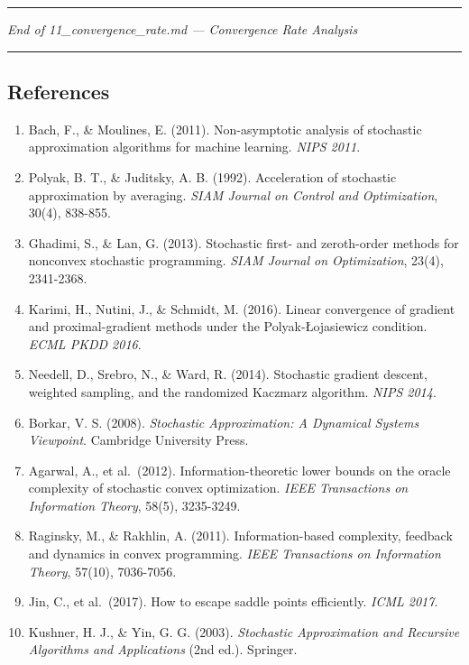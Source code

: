 \documentclass[
  12pt,
]{article}
\providecommand{\tightlist}{%
  \setlength{\itemsep}{0pt}\setlength{\parskip}{0pt}}
\begin{document}
\begin{center}\rule{0.5\linewidth}{0.5pt}\end{center}

\emph{End of 11\_convergence\_rate.md --- Convergence Rate Analysis}

\begin{center}\rule{0.5\linewidth}{0.5pt}\end{center}

\subsection{References}\label{references}

\begin{enumerate}
\def\labelenumi{\arabic{enumi}.}
\tightlist
\item
  Bach, F., \& Moulines, E. (2011). Non-asymptotic analysis of
  stochastic approximation algorithms for machine learning. \emph{NIPS
  2011}.
\item
  Polyak, B. T., \& Juditsky, A. B. (1992). Acceleration of stochastic
  approximation by averaging. \emph{SIAM Journal on Control and
  Optimization}, 30(4), 838-855.
\item
  Ghadimi, S., \& Lan, G. (2013). Stochastic first- and zeroth-order
  methods for nonconvex stochastic programming. \emph{SIAM Journal on
  Optimization}, 23(4), 2341-2368.
\item
  Karimi, H., Nutini, J., \& Schmidt, M. (2016). Linear convergence of
  gradient and proximal-gradient methods under the Polyak-Łojasiewicz
  condition. \emph{ECML PKDD 2016}.
\item
  Needell, D., Srebro, N., \& Ward, R. (2014). Stochastic gradient
  descent, weighted sampling, and the randomized Kaczmarz algorithm.
  \emph{NIPS 2014}.
\item
  Borkar, V. S. (2008). \emph{Stochastic Approximation: A Dynamical
  Systems Viewpoint}. Cambridge University Press.
\item
  Agarwal, A., et al.~(2012). Information-theoretic lower bounds on the
  oracle complexity of stochastic convex optimization. \emph{IEEE
  Transactions on Information Theory}, 58(5), 3235-3249.
\item
  Raginsky, M., \& Rakhlin, A. (2011). Information-based complexity,
  feedback and dynamics in convex programming. \emph{IEEE Transactions
  on Information Theory}, 57(10), 7036-7056.
\item
  Jin, C., et al.~(2017). How to escape saddle points efficiently.
  \emph{ICML 2017}.
\item
  Kushner, H. J., \& Yin, G. G. (2003). \emph{Stochastic Approximation
  and Recursive Algorithms and Applications} (2nd ed.). Springer.
\end{enumerate}
\end{document}
